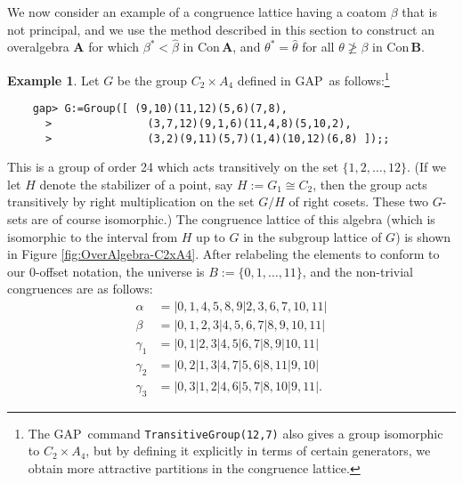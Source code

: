\documentclass[cm,dissertation]{uhthesis}
\theoremstyle{plain}
\theoremstyle{definition}
\newtheorem{example}[theorem]{Example}
\theoremstyle{remark}
\numberwithin{theorem}{section}
\numberwithin{claim}{chapter}
\numberwithin{equation}{section}
\numberwithin{conjecture}{chapter}
\newcommand{\<}{\ensuremath{\langle}}
\renewcommand{\>}{\ensuremath{\rangle}}
\renewcommand{\ngeq}{\ensuremath{\ngeqslant}}
\newcommand{\Con}{\ensuremath{\mathrm{Con\,}}}
\newcommand{\GAP}{\textsf{GAP}}
\newcommand{\0}{\ensuremath{\mathbf{0}}}
\newcommand{\1}{\ensuremath{\mathbf{1}}}
\newcommand{\2}{\ensuremath{\mathbf{2}}}
\newcommand{\3}{\ensuremath{\mathbf{3}}}
\newcommand{\4}{\ensuremath{\mathbf{4}}}
\newcommand{\5}{\ensuremath{\mathbf{5}}}
\newcommand{\bA}{\ensuremath{\mathbf{A}}}
\newcommand{\bB}{\ensuremath{\mathbf{B}}}
\begin{document}
We now consider an example of a congruence lattice having a coatom $\beta$ that is not principal,
and we use the method described in this section to construct an overalgebra $\bA$ for which
$\beta^* < \widehat{\beta}$ in $\Con \bA$, and 
$\theta^* = \widehat{\theta}$ for all $\theta \ngeq \beta$ in $\Con\bB$.

\begin{example}
  
  Let $G$ be the group $C_2 \times A_4$ defined in \GAP\ as
  follows:\footnote{The \GAP\ command {\tt TransitiveGroup(12,7)} also gives a group
    isomorphic to $C_2 \times A_4$, but by defining it explicitly
    in terms of certain generators, we obtain more attractive partitions in the
    congruence lattice.}

  {\footnotesize
\begin{verbatim}
    gap> G:=Group([ (9,10)(11,12)(5,6)(7,8), 
      >               (3,7,12)(9,1,6)(11,4,8)(5,10,2), 
      >               (3,2)(9,11)(5,7)(1,4)(10,12)(6,8) ]);;
\end{verbatim}
  }

  \noindent This is a group of order 24 which acts transitively 
  on the set $\{1, 2, \dots, 12\}$.
  (If we let $H$ denote the stabilizer of a point, say $H:=G_1 \cong C_2$,
  then the group acts transitively by right multiplication on the set $G/H$ of right
  cosets. These two $G$-sets are of course isomorphic.)
  The congruence lattice of this algebra (which is isomorphic
  to the interval from $H$ up to $G$ in the subgroup lattice of $G$) is shown in 
  Figure \ref{fig:OverAlgebra-C2xA4}.
  After relabeling the elements to conform to our
  0-offset notation, the universe is
  $B:=\{0, 1, \dots, 11\}$, and 
  the non-trivial congruences are as follows:
  \begin{align*}
    \alpha &=|0, 1, 4, 5, 8, 9| 2, 3, 6, 7, 10, 11|\\
    \beta &= | 0, 1, 2, 3 | 4, 5, 6, 7 | 8, 9, 10, 11|\\
    \gamma_1 &=| 0, 1 | 2, 3 | 4, 5 | 6, 7 | 8, 9 | 10, 11|\\
    \gamma_2 &=| 0, 2 | 1, 3 | 4, 7 | 5, 6 | 8, 11 | 9, 10 |\\
    \gamma_3 &=| 0, 3 | 1, 2 | 4, 6 | 5, 7 | 8, 10 | 9, 11 |.
  \end{align*}

  \begin{figure}[h!]
    \centering
\end{figure}
\end{example}
\end{document}
